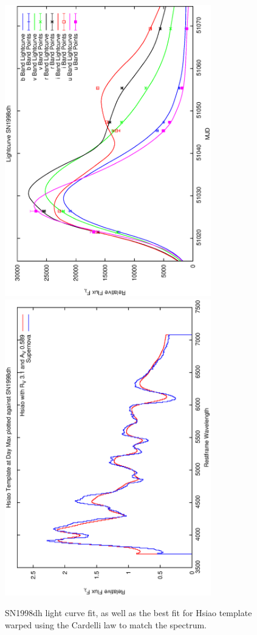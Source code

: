 \clearpage

\begin{figure}[p]
\centering
\includegraphics[angle=-90,width=0.8\textwidth]{./figures/ltcv/SN1998dh_v027_lightcurve.ps}
\hfill
\includegraphics[angle=-90,width=0.8\textwidth]{./figures/hsiao/SN1998dh_v001_hsiao.ps}
\hfill
\caption{SN1998dh light curve fit, as well as the best fit for Hsiao template warped using the Cardelli law to match the spectrum.}
\label{fig:SN1998dhfour2}
\end{figure}

